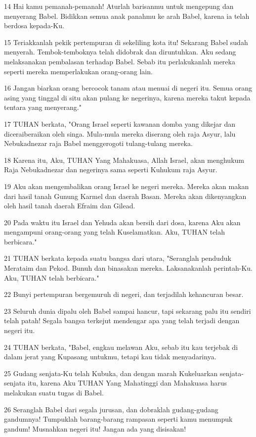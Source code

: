 \par 14 Hai kamu pemanah-pemanah! Aturlah barisanmu untuk mengepung dan menyerang Babel. Bidikkan semua anak panahmu ke arah Babel, karena ia telah berdosa kepada-Ku.
\par 15 Teriakkanlah pekik pertempuran di sekeliling kota itu! Sekarang Babel sudah menyerah. Tembok-temboknya telah didobrak dan diruntuhkan. Aku sedang melaksanakan pembalasan terhadap Babel. Sebab itu perlakukanlah mereka seperti mereka memperlakukan orang-orang lain.
\par 16 Jangan biarkan orang bercocok tanam atau menuai di negeri itu. Semua orang asing yang tinggal di situ akan pulang ke negerinya, karena mereka takut kepada tentara yang menyerang."
\par 17 TUHAN berkata, "Orang Israel seperti kawanan domba yang dikejar dan diceraiberaikan oleh singa. Mula-mula mereka diserang oleh raja Asyur, lalu Nebukadnezar raja Babel menggerogoti tulang-tulang mereka.
\par 18 Karena itu, Aku, TUHAN Yang Mahakuasa, Allah Israel, akan menghukum Raja Nebukadnezar dan negerinya sama seperti Kuhukum raja Asyur.
\par 19 Aku akan mengembalikan orang Israel ke negeri mereka. Mereka akan makan dari hasil tanah Gunung Karmel dan daerah Basan. Mereka akan dikenyangkan oleh hasil tanah daerah Efraim dan Gilead.
\par 20 Pada waktu itu Israel dan Yehuda akan bersih dari dosa, karena Aku akan mengampuni orang-orang yang telah Kuselamatkan. Aku, TUHAN telah berbicara."
\par 21 TUHAN berkata kepada suatu bangsa dari utara, "Seranglah penduduk Merataim dan Pekod. Bunuh dan binasakan mereka. Laksanakanlah perintah-Ku. Aku, TUHAN telah berbicara."
\par 22 Bunyi pertempuran bergemuruh di negeri, dan terjadilah kehancuran besar.
\par 23 Seluruh dunia dipalu oleh Babel sampai hancur, tapi sekarang palu itu sendiri telah patah! Segala bangsa terkejut mendengar apa yang telah terjadi dengan negeri itu.
\par 24 TUHAN berkata, "Babel, engkau melawan Aku, sebab itu kau terjebak di dalam jerat yang Kupasang untukmu, tetapi kau tidak menyadarinya.
\par 25 Gudang senjata-Ku telah Kubuka, dan dengan marah Kukeluarkan senjata-senjata itu, karena Aku TUHAN Yang Mahatinggi dan Mahakuasa harus melakukan suatu tugas di Babel.
\par 26 Seranglah Babel dari segala jurusan, dan dobraklah gudang-gudang gandumnya! Tumpuklah barang-barang rampasan seperti kamu menumpuk gandum! Musnahkan negeri itu! Jangan ada yang disisakan!
